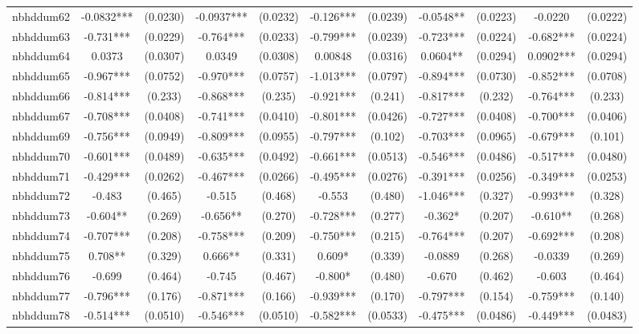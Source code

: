\documentclass[]{article}
\begin{document}
\begin{tabular}{lcccccccccc}
nbhddum62 & -0.0832*** & (0.0230) & -0.0937*** & (0.0232) & -0.126*** & (0.0239) & -0.0548** & (0.0223) & -0.0220 & (0.0222) \\
nbhddum63 & -0.731*** & (0.0229) & -0.764*** & (0.0233) & -0.799*** & (0.0239) & -0.723*** & (0.0224) & -0.682*** & (0.0224) \\
nbhddum64 & 0.0373 & (0.0307) & 0.0349 & (0.0308) & 0.00848 & (0.0316) & 0.0604** & (0.0294) & 0.0902*** & (0.0294) \\
nbhddum65 & -0.967*** & (0.0752) & -0.970*** & (0.0757) & -1.013*** & (0.0797) & -0.894*** & (0.0730) & -0.852*** & (0.0708) \\
nbhddum66 & -0.814*** & (0.233) & -0.868*** & (0.235) & -0.921*** & (0.241) & -0.817*** & (0.232) & -0.764*** & (0.233) \\
nbhddum67 & -0.708*** & (0.0408) & -0.741*** & (0.0410) & -0.801*** & (0.0426) & -0.727*** & (0.0408) & -0.700*** & (0.0406) \\
nbhddum69 & -0.756*** & (0.0949) & -0.809*** & (0.0955) & -0.797*** & (0.102) & -0.703*** & (0.0965) & -0.679*** & (0.101) \\
nbhddum70 & -0.601*** & (0.0489) & -0.635*** & (0.0492) & -0.661*** & (0.0513) & -0.546*** & (0.0486) & -0.517*** & (0.0480) \\
nbhddum71 & -0.429*** & (0.0262) & -0.467*** & (0.0266) & -0.495*** & (0.0276) & -0.391*** & (0.0256) & -0.349*** & (0.0253) \\
nbhddum72 & -0.483 & (0.465) & -0.515 & (0.468) & -0.553 & (0.480) & -1.046*** & (0.327) & -0.993*** & (0.328) \\
nbhddum73 & -0.604** & (0.269) & -0.656** & (0.270) & -0.728*** & (0.277) & -0.362* & (0.207) & -0.610** & (0.268) \\
nbhddum74 & -0.707*** & (0.208) & -0.758*** & (0.209) & -0.750*** & (0.215) & -0.764*** & (0.207) & -0.692*** & (0.208) \\
nbhddum75 & 0.708** & (0.329) & 0.666** & (0.331) & 0.609* & (0.339) & -0.0889 & (0.268) & -0.0339 & (0.269) \\
nbhddum76 & -0.699 & (0.464) & -0.745 & (0.467) & -0.800* & (0.480) & -0.670 & (0.462) & -0.603 & (0.464) \\
nbhddum77 & -0.796*** & (0.176) & -0.871*** & (0.166) & -0.939*** & (0.170) & -0.797*** & (0.154) & -0.759*** & (0.140) \\
nbhddum78 & -0.514*** & (0.0510) & -0.546*** & (0.0510) & -0.582*** & (0.0533) & -0.475*** & (0.0486) & -0.449*** & (0.0483) \\

\end{tabular}
\end{document}
